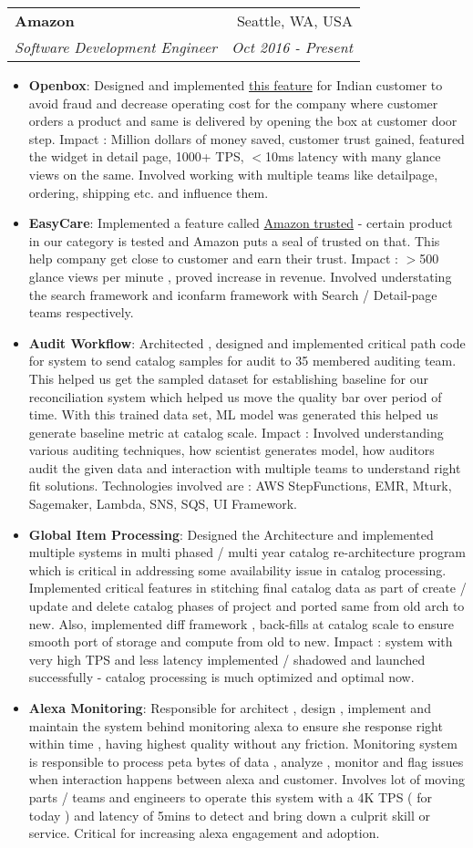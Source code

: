 \documentclass[letterpaper,11pt]{article}
\makeatletter
\newcommand{\resumeItem}[2]{
  \item\small{
    \textbf{#1}{: #2 \vspace{-2pt}}
  }
}
\newcommand{\resumeSubheading}[4]{
  \vspace{-1pt}\item
    \begin{tabular*}{0.97\textwidth}{l@{\extracolsep{\fill}}r}
      \textbf{#1} & #2 \\
      \textit{\small#3} & \textit{\small #4} \\
    \end{tabular*}\vspace{-5pt}
}
\newcommand{\resumeItemListStart}{\begin{itemize}}
\newcommand{\resumeItemListEnd}{\end{itemize}\vspace{-5pt}}
\makeatother
\begin{document}
    \resumeSubheading
      {Amazon}{Seattle, WA, USA}
      {Software Development Engineer}{Oct 2016 - Present}
      \resumeItemListStart
        \resumeItem{Openbox}
          {Designed and implemented \href{https://www.amazon.in/gp/help/customer/display.html/ref=dp_openbox_read_more_desktop_en_in?ie=UTF8&pop-up=1&nodeId=GNHMSYW5BTFBTMEW}{this feature} for Indian customer to avoid fraud and decrease operating cost for the company where customer orders a product and same is delivered by opening the box at customer door step. Impact : Million dollars of money saved, customer trust gained, featured the widget in detail page, 1000+ TPS, $<$10ms latency with many glance views on the same. Involved working with multiple teams like detailpage, ordering, shipping etc. and influence them.}
        \resumeItem{EasyCare}
          {Implemented a feature called \href{https://www.amazon.in/amazontrusted}{Amazon trusted} - certain product in our category is tested and Amazon puts a seal of trusted on that. This help company get close to customer and earn their trust. Impact : $>$500 glance views per minute , proved increase in revenue. Involved understating the search framework and iconfarm framework with Search / Detail-page teams respectively.}
        \resumeItem{Audit Workflow}
          {Architected , designed and implemented critical path code for system to send catalog samples for audit to 35 membered auditing team. This helped us get the sampled dataset for establishing baseline for our reconciliation system which helped us move the quality bar over period of time. With this trained data set, ML model was generated this helped us generate baseline metric at catalog scale. Impact : Involved understanding various auditing techniques, how scientist generates model, how auditors audit the given data and interaction with multiple teams to understand right fit solutions. Technologies involved are : AWS StepFunctions, EMR, Mturk, Sagemaker, Lambda, SNS, SQS, UI Framework.}
        \resumeItem{Global Item Processing}
          {Designed the Architecture and implemented multiple systems in multi phased / multi year catalog re-architecture program which is critical in addressing some availability issue in catalog processing. Implemented critical features in stitching final catalog data as part of create / update and delete catalog phases of project and ported same from old arch to new. Also, implemented diff framework , back-fills at catalog scale to ensure smooth port of storage and compute from old to new. Impact : system with very high TPS and less latency implemented / shadowed and launched successfully - catalog processing is much optimized and optimal now.}
         \resumeItem{Alexa Monitoring}
          {Responsible for architect , design , implement and maintain the system behind monitoring alexa to ensure she response right within time , having highest quality without any friction. Monitoring system is responsible to process peta bytes of data , analyze , monitor and flag issues when interaction happens between alexa and customer. Involves lot of moving parts / teams and engineers to operate this system with a 4K TPS ( for today ) and latency of 5mins to detect and bring down a culprit skill or service. Critical for increasing alexa engagement and adoption.}
      \resumeItemListEnd
\end{document}
